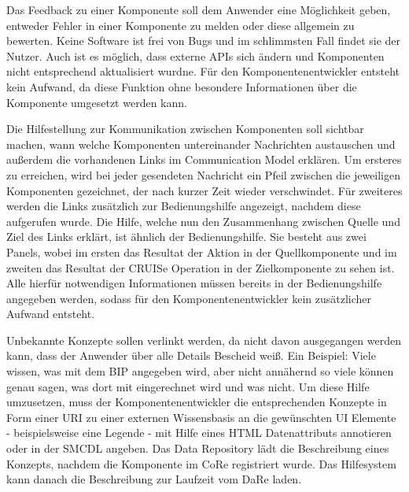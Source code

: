 \documentclass[
	headsepline,
	footsepline,
	fontsize=12pt,
	bibliography=totoc
]{scrbook}
\begin{document}

Das Feedback zu einer Komponente soll dem Anwender eine Möglichkeit geben, entweder Fehler in einer Komponente zu melden oder diese allgemein zu bewerten. Keine Software ist frei von Bugs und im schlimmsten Fall findet sie der Nutzer. Auch ist es möglich, dass externe APIs sich ändern und Komponenten nicht entsprechend aktualisiert wurdne. Für den Komponentenentwickler entsteht kein Aufwand, da diese Funktion ohne besondere Informationen über die Komponente umgesetzt werden kann.


Die Hilfestellung zur Kommunikation zwischen Komponenten soll sichtbar machen, wann welche Komponenten untereinander Nachrichten austauschen und außerdem die vorhandenen Links im Communication Model erklären. Um ersteres zu erreichen, wird bei jeder gesendeten Nachricht ein Pfeil zwischen die jeweiligen Komponenten gezeichnet, der nach kurzer Zeit wieder verschwindet. Für zweiteres werden die Links zusätzlich zur Bedienungshilfe angezeigt, nachdem diese aufgerufen wurde. Die Hilfe, welche nun den Zusammenhang zwischen Quelle und Ziel des Links erklärt, ist ähnlich der Bedienungshilfe. Sie besteht aus zwei Panels, wobei im ersten das Resultat der Aktion in der Quellkomponente und im zweiten das Resultat der CRUISe Operation in der Zielkomponente zu sehen ist. Alle hierfür notwendigen Informationen müssen bereits in der Bedienungshilfe angegeben werden, sodass für den Komponentenentwickler kein zusätzlicher Aufwand entsteht.


Unbekannte Konzepte sollen verlinkt werden, da nicht davon ausgegangen werden kann, dass der Anwender über alle Details Bescheid weiß. Ein Beispiel: Viele wissen, was mit dem BIP angegeben wird, aber nicht annähernd so viele können genau sagen, was dort mit eingerechnet wird und was nicht. Um diese Hilfe umzusetzen, muss der Komponentenentwickler die entsprechenden Konzepte in Form einer URI zu einer externen Wissensbasis an die gewünschten UI Elemente - beispielsweise eine Legende - mit Hilfe eines HTML Datenattributs annotieren oder in der SMCDL angeben. Das Data Repository lädt die Beschreibung eines Konzepts, nachdem die Komponente im CoRe registriert wurde. Das Hilfesystem kann danach die Beschreibung zur Laufzeit vom DaRe laden.

\end{document}
